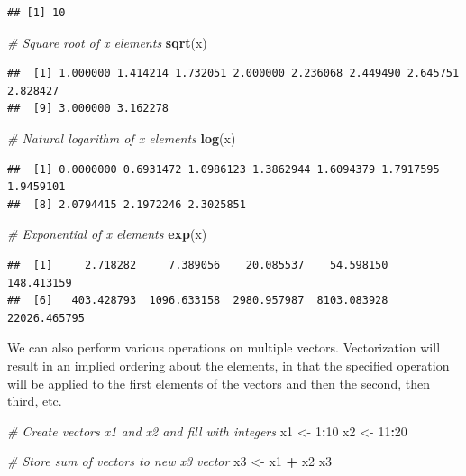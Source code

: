 \documentclass[]{book}
\newenvironment{Shaded}{\begin{snugshade}}{\end{snugshade}}
\newcommand{\CommentTok}[1]{\textcolor[rgb]{0.56,0.35,0.01}{\textit{#1}}}
\newcommand{\DecValTok}[1]{\textcolor[rgb]{0.00,0.00,0.81}{#1}}
\newcommand{\KeywordTok}[1]{\textcolor[rgb]{0.13,0.29,0.53}{\textbf{#1}}}
\newcommand{\NormalTok}[1]{#1}
\newcommand{\OperatorTok}[1]{\textcolor[rgb]{0.81,0.36,0.00}{\textbf{#1}}}
\newcommand{\StringTok}[1]{\textcolor[rgb]{0.31,0.60,0.02}{#1}}
\begin{document}
\begin{verbatim}
## [1] 10
\end{verbatim}

\begin{Shaded}
\begin{Highlighting}[]
\CommentTok{# Square root of x elements}
\KeywordTok{sqrt}\NormalTok{(x)}
\end{Highlighting}
\end{Shaded}

\begin{verbatim}
##  [1] 1.000000 1.414214 1.732051 2.000000 2.236068 2.449490 2.645751 2.828427
##  [9] 3.000000 3.162278
\end{verbatim}

\begin{Shaded}
\begin{Highlighting}[]
\CommentTok{# Natural logarithm of x elements}
\KeywordTok{log}\NormalTok{(x)}
\end{Highlighting}
\end{Shaded}

\begin{verbatim}
##  [1] 0.0000000 0.6931472 1.0986123 1.3862944 1.6094379 1.7917595 1.9459101
##  [8] 2.0794415 2.1972246 2.3025851
\end{verbatim}

\begin{Shaded}
\begin{Highlighting}[]
\CommentTok{# Exponential of x elements}
\KeywordTok{exp}\NormalTok{(x)}
\end{Highlighting}
\end{Shaded}

\begin{verbatim}
##  [1]     2.718282     7.389056    20.085537    54.598150   148.413159
##  [6]   403.428793  1096.633158  2980.957987  8103.083928 22026.465795
\end{verbatim}

We can also perform various operations on multiple vectors. Vectorization will result in an implied ordering about the elements, in that the specified operation will be applied to the first elements of the vectors and then the second, then third, etc.

\begin{Shaded}
\begin{Highlighting}[]
\CommentTok{# Create vectors x1 and x2 and fill with integers}
\NormalTok{x1 <-}\StringTok{ }\DecValTok{1}\OperatorTok{:}\DecValTok{10}
\NormalTok{x2 <-}\StringTok{ }\DecValTok{11}\OperatorTok{:}\DecValTok{20}

\CommentTok{# Store sum of vectors to new x3 vector}
\NormalTok{x3 <-}\StringTok{ }\NormalTok{x1 }\OperatorTok{+}\StringTok{ }\NormalTok{x2}
\NormalTok{x3}
\end{Highlighting}
\end{Shaded}
\end{document}
